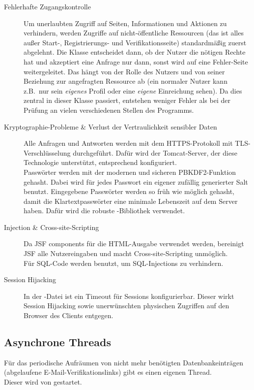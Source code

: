 \begin{description}
\item[Fehlerhafte Zugangskontrolle] 
Um unerlaubten Zugriff auf Seiten, Informationen und Aktionen zu verhindern, werden Zugriffe auf nicht-öffentliche Ressourcen (das ist alles außer Start-, Registrierungs- und Verifikationsseite) standardmäßig zuerst abgelehnt.
Die Klasse  entscheidet dann, ob der Nutzer die nötigen Rechte hat und akzeptiert eine Anfrage nur dann, sonst wird auf eine Fehler-Seite weitergeleitet.
Das hängt von der Rolle des Nutzers und von seiner Beziehung zur angefragten Ressource ab (ein normaler Nutzer kann z.B.\ nur sein \emph{eigenes} Profil oder eine \emph{eigene} Einreichung sehen).
Da dies zentral in dieser Klasse passiert, entstehen weniger Fehler als bei der Prüfung an vielen verschiedenen Stellen des Programms.

\item[Kryptographie-Probleme \& Verlust der Vertraulichkeit sensibler Daten]
Alle Anfragen und Antworten werden mit dem HTTPS-Protokoll mit TLS-Verschlüsselung durchgeführt.
Dafür wird der Tomcat-Server, der diese Technologie unterstützt, entsprechend konfiguriert.
\\
Passwörter werden mit der modernen und sicheren PBKDF2-Funktion gehasht. Dabei wird für jedes Passwort ein eigener zufällig generierter Salt benutzt. Eingegebene Passwörter werden so früh wie möglich gehasht, damit die Klartextpasswörter eine minimale Lebenszeit auf dem Server haben.  Dafür wird die robuste -Bibliothek verwendet.

\item[Injection \& Cross-site-Scripting]
Da JSF components für die HTML-Ausgabe verwendet werden, bereinigt JSF alle Nutzereingaben und macht Cross-site-Scripting unmöglich.
\\
Für SQL-Code werden  benutzt, um SQL-Injections zu verhindern.

\item[Session Hijacking]
In der -Datei ist ein Timeout für Sessions konfigurierbar.
Dieser wirkt Session Hijacking sowie unerwünschten physischen Zugriffen auf den Browser des Clients entgegen.

\end{description}

\subsection{Asynchrone Threads}\label{subsec:threads}
Für das periodische Aufräumen von nicht mehr benötigten Datenbankeinträgen (abgelaufene E-Mail-Verifikationslinks) gibt es einen eigenen Thread.
\\
Dieser wird von  gestartet.

